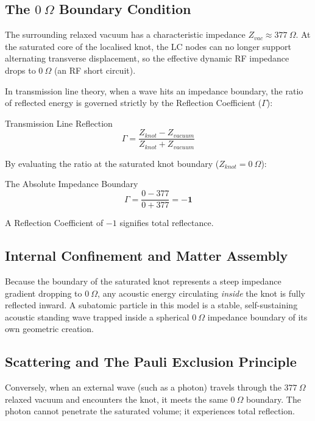 \subsection{The $0 \ \Omega$ Boundary Condition}
The surrounding relaxed vacuum has a characteristic impedance $Z_{vac} \approx 377 \ \Omega$. At the saturated core of the localised knot, the LC nodes can no longer support alternating transverse displacement, so the effective dynamic RF impedance drops to $0 \ \Omega$ (an RF short circuit).

In transmission line theory, when a wave hits an impedance boundary, the ratio of reflected energy is governed strictly by the Reflection Coefficient ($\Gamma$):
\begin{resultbox}{Transmission Line Reflection}
\begin{equation}
    \Gamma = \frac{Z_{knot} - Z_{vacuum}}{Z_{knot} + Z_{vacuum}}
\end{equation}
\end{resultbox}

By evaluating the ratio at the saturated knot boundary ($Z_{knot} = 0 \ \Omega$):
\begin{resultbox}{The Absolute Impedance Boundary}
\begin{equation}
    \Gamma = \frac{0 - 377}{0 + 377} = \mathbf{-1}
\end{equation}
\end{resultbox}
A Reflection Coefficient of $-1$ signifies total reflectance.

\subsection{Internal Confinement and Matter Assembly}
Because the boundary of the saturated knot represents a steep impedance gradient dropping to $0 \ \Omega$, any acoustic energy circulating \textit{inside} the knot is fully reflected inward. 
A subatomic particle in this model is a stable, self-sustaining acoustic standing wave trapped inside a spherical $0 \ \Omega$ impedance boundary of its own geometric creation.

\subsection{Scattering and The Pauli Exclusion Principle}
Conversely, when an external wave (such as a photon) travels through the $377 \ \Omega$ relaxed vacuum and encounters the knot, it meets the same $0 \ \Omega$ boundary. The photon cannot penetrate the saturated volume; it experiences total reflection. 

